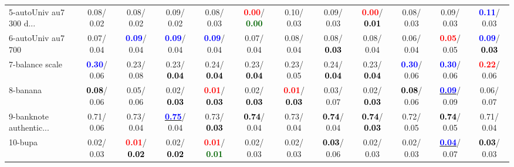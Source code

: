 \begin{table}[h]
\begin{center}
{\begin{tabular}{lc|c|c|c|c|c|c|c|c|c|c}
5-autoUniv au7 300 d... &   0.08/  0.02 &   0.08/  0.02 &   0.09/  0.02 &   0.08/  0.03 & \textcolor{red}{\textbf{  0.00}}/\textcolor{darkgreen}{\textbf{  0.00}} &   0.10/  0.03 &   0.09/  0.03 & \textcolor{red}{\textbf{  0.00}}/\textcolor{black}{\textbf{  0.01}} &   0.08/  0.03 &   0.09/  0.03 & \textcolor{blue}{\textbf{  0.11}}/  0.03 \\
6-autoUniv au7 700 &   0.07/  0.04 & \textcolor{blue}{\textbf{  0.09}}/  0.04 & \textcolor{blue}{\textbf{  0.09}}/  0.04 & \textcolor{blue}{\textbf{  0.09}}/  0.04 &   0.07/  0.04 &   0.08/  0.04 &   0.08/\textcolor{black}{\textbf{  0.03}} &   0.08/  0.04 &   0.06/  0.04 & \textcolor{red}{\textbf{  0.05}}/  0.05 & \textcolor{blue}{\textbf{  0.09}}/\textcolor{black}{\textbf{  0.03}} \\
7-balance scale & \textcolor{blue}{\textbf{  0.30}}/  0.06 &   0.23/  0.08 &   0.23/\textcolor{black}{\textbf{  0.04}} &   0.24/\textcolor{black}{\textbf{  0.04}} &   0.23/\textcolor{black}{\textbf{  0.04}} &   0.23/  0.05 &   0.24/\textcolor{black}{\textbf{  0.04}} &   0.23/\textcolor{black}{\textbf{  0.04}} & \textcolor{blue}{\textbf{  0.30}}/  0.06 & \textcolor{blue}{\textbf{  0.30}}/  0.06 & \textcolor{red}{\textbf{  0.22}}/  0.06 \\ \hline
8-banana & \textcolor{black}{\textbf{  0.08}}/  0.06 &   0.05/  0.06 &   0.02/\textcolor{black}{\textbf{  0.03}} & \textcolor{red}{\textbf{  0.01}}/\textcolor{black}{\textbf{  0.03}} &   0.02/\textcolor{black}{\textbf{  0.03}} & \textcolor{red}{\textbf{  0.01}}/\textcolor{black}{\textbf{  0.03}} &   0.03/  0.07 &   0.02/\textcolor{black}{\textbf{  0.03}} & \textcolor{black}{\textbf{  0.08}}/  0.06 & \underline{\textcolor{blue}{\textbf{  0.09}}}/  0.09 &   0.06/  0.07 \\
9-banknote authentic... &   0.71/  0.06 &   0.73/  0.04 & \underline{\textcolor{blue}{\textbf{  0.75}}}/  0.04 &   0.73/\textcolor{black}{\textbf{  0.03}} & \textcolor{black}{\textbf{  0.74}}/  0.04 &   0.73/  0.04 & \textcolor{black}{\textbf{  0.74}}/  0.04 & \textcolor{black}{\textbf{  0.74}}/\textcolor{black}{\textbf{  0.03}} &   0.72/  0.05 & \textcolor{black}{\textbf{  0.74}}/  0.05 &   0.71/  0.04 \\
10-bupa &   0.02/  0.03 & \textcolor{red}{\textbf{  0.01}}/\textcolor{black}{\textbf{  0.02}} &   0.02/\textcolor{black}{\textbf{  0.02}} & \textcolor{red}{\textbf{  0.01}}/\textcolor{darkgreen}{\textbf{  0.01}} &   0.02/  0.03 &   0.02/  0.03 & \textcolor{black}{\textbf{  0.03}}/  0.06 &   0.02/  0.03 &   0.02/  0.03 & \underline{\textcolor{blue}{\textbf{  0.04}}}/  0.07 & \textcolor{black}{\textbf{  0.03}}/  0.03 \\

\end{tabular}}
\end{center}
\end{table}
